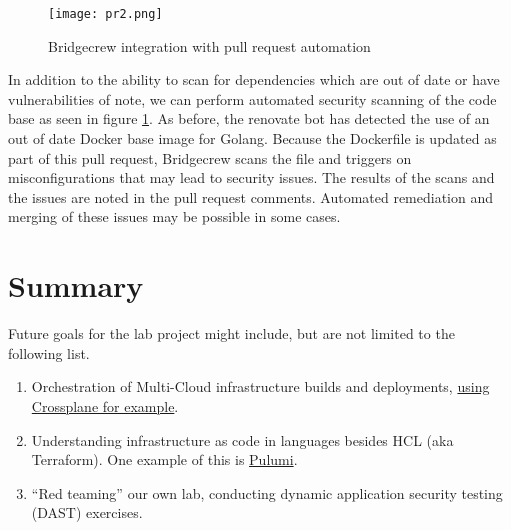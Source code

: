 \begin{figure}[ht]
	\texttt{[image: pr2.png]}
	\caption{Bridgecrew integration with pull request automation}
	\label{pr2}
\end{figure}

In addition to the ability to scan for dependencies which are out of date or have vulnerabilities of note, we can perform automated security scanning
of the code base as seen in figure \ref{pr2}. As before, the renovate bot has detected the use of an out of date Docker base image for Golang. Because
the Dockerfile is updated as part of this pull request, Bridgecrew scans the file and triggers on misconfigurations that may lead to security issues.
The results of the scans and the issues are noted in the pull request comments. Automated remediation and merging of these issues may be possible in
some cases.



\section{\label{sec:Summary}Summary}
\vspace{2mm}
Future goals for the lab project might include, but are not limited to the following list.
\vspace{2mm}
\begin{raggedright}
	\begin{enumerate}
		\item Orchestration of Multi-Cloud infrastructure builds and deployments, \href{https://crossplane.io/docs/v1.3/}{using Crossplane for example}.
		\item Understanding infrastructure as code in languages besides HCL (aka Terraform). One example of this is \href{https://www.pulumi.com/}{Pulumi}.
		\item ``Red teaming'' our own lab, conducting dynamic application security testing (DAST) exercises.
	\end{enumerate}
\end{raggedright}
\vspace{2mm}

\nocite{*}




